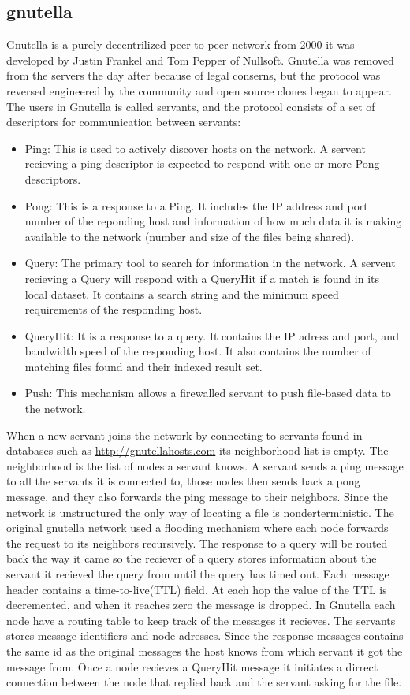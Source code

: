 \subsection{gnutella}
\label{sec:gnutella}
Gnutella is a purely decentrilized peer-to-peer network from 2000 it was developed by Justin Frankel and Tom Pepper of Nullsoft. Gnutella was removed from the servers the day after because of legal conserns, but the protocol was reversed engineered by the community and open source clones began to appear.
The users in Gnutella is called servants, and the protocol consists of a set of descriptors for communication between servants:
\begin{itemize}
\item Ping: This is used to actively discover hosts on the network. A servent recieving a ping descriptor is expected to respond with one or more Pong descriptors.
\item Pong: This is a response to a Ping. It includes the IP address and port number of the reponding host and information of how much data it is making available to the network (number and size of the files being shared).
\item Query: The primary tool to search for information in the network. A servent recieving a Query will respond with a QueryHit if a match is found in its local dataset. It contains a search string and the minimum speed requirements of the responding host.
\item QueryHit: It is a response to a query. It contains the IP adress and port, and bandwidth speed of the responding host. It also contains the number of matching files found and their indexed result set.
\item Push: This mechanism allows a firewalled servant to push file-based data to the network.
\end{itemize}
When a new servant joins the network by connecting to servants found in databases such as \url{http://gnutellahosts.com} its neighborhood list is empty. The neighborhood is the list of nodes a servant knows. A servant sends a ping message to all the servants it is connected to, those nodes then sends back a pong message, and they also forwards the ping message to their neighbors.
Since the network is unstructured the only way of locating a file is nonderterministic. The original gnutella network used a flooding mechanism where each node forwards the request to its neighbors recursively. The response to a query will be routed back the way it came so the reciever of a query stores information about the servant it recieved the query from until the query has timed out. Each message header contains a time-to-live(TTL) field. At each hop the value of the TTL is decremented, and when it reaches zero the message is dropped. In Gnutella each node have a routing table to keep track of the messages it recieves. The servants stores message identifiers and node adresses. Since the response messages contains the same id as the original messages the host knows from which servant it got the message from.
Once a node recieves a QueryHit message it initiates a dirrect connection between the node that replied back and the servant asking for the file.

